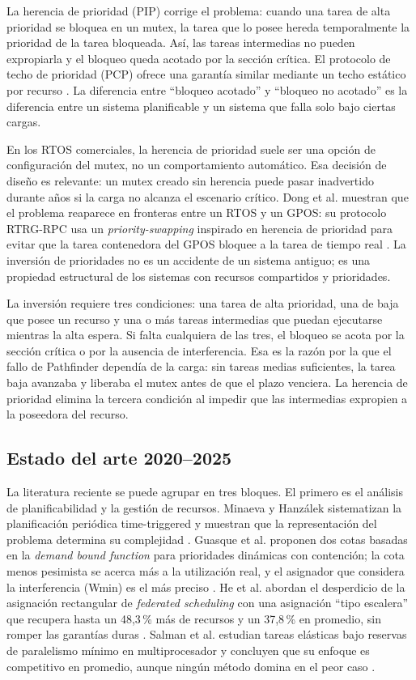 \documentclass[journal]{IEEEtran}
\begin{document}
La herencia de prioridad (PIP) corrige el problema: cuando una tarea de alta prioridad se bloquea en un mutex, la tarea que lo posee hereda temporalmente la prioridad de la tarea bloqueada. Así, las tareas intermedias no pueden expropiarla y el bloqueo queda acotado por la sección crítica. El protocolo de techo de prioridad (PCP) ofrece una garantía similar mediante un techo estático por recurso \cite{sha1990priority}. La diferencia entre ``bloqueo acotado'' y ``bloqueo no acotado'' es la diferencia entre un sistema planificable y un sistema que falla solo bajo ciertas cargas.

En los RTOS comerciales, la herencia de prioridad suele ser una opción de configuración del mutex, no un comportamiento automático. Esa decisión de diseño es relevante: un mutex creado sin herencia puede pasar inadvertido durante años si la carga no alcanza el escenario crítico. Dong et al. muestran que el problema reaparece en fronteras entre un RTOS y un GPOS: su protocolo RTRG-RPC usa un \emph{priority-swapping} inspirado en herencia de prioridad para evitar que la tarea contenedora del GPOS bloquee a la tarea de tiempo real \cite{dong2020build}. La inversión de prioridades no es un accidente de un sistema antiguo; es una propiedad estructural de los sistemas con recursos compartidos y prioridades.

La inversión requiere tres condiciones: una tarea de alta prioridad, una de baja que posee un recurso y una o más tareas intermedias que puedan ejecutarse mientras la alta espera. Si falta cualquiera de las tres, el bloqueo se acota por la sección crítica o por la ausencia de interferencia. Esa es la razón por la que el fallo de Pathfinder dependía de la carga: sin tareas medias suficientes, la tarea baja avanzaba y liberaba el mutex antes de que el plazo venciera. La herencia de prioridad elimina la tercera condición al impedir que las intermedias expropien a la poseedora del recurso.

\subsection{Estado del arte 2020--2025}

La literatura reciente se puede agrupar en tres bloques. El primero es el análisis de planificabilidad y la gestión de recursos. Minaeva y Hanzálek sistematizan la planificación periódica time-triggered y muestran que la representación del problema determina su complejidad \cite{minaeva2021survey}. Guasque et al. proponen dos cotas basadas en la \emph{demand bound function} para prioridades dinámicas con contención; la cota menos pesimista se acerca más a la utilización real, y el asignador que considera la interferencia (Wmin) es el más preciso \cite{guasque2022schedulability}. He et al. abordan el desperdicio de la asignación rectangular de \emph{federated scheduling} con una asignación ``tipo escalera'' que recupera hasta un 48,3\,\% más de recursos y un 37,8\,\% en promedio, sin romper las garantías duras \cite{he2024resource}. Salman et al. estudian tareas elásticas bajo reservas de paralelismo mínimo en multiprocesador y concluyen que su enfoque es competitivo en promedio, aunque ningún método domina en el peor caso \cite{salman2022multiprocessor}.
\end{document}
